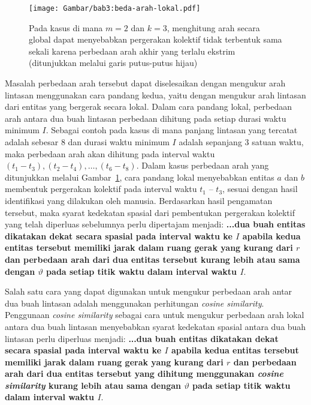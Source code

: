 \begin{figure}[h]
    \centering
    \captionsetup{width=0.8\textwidth}
    \texttt{[image: Gambar/bab3:beda-arah-lokal.pdf]}
    \caption[Masalah identifikasi pada penghitungan arah secara global]{Pada kasus di mana $m = 2$ dan $k = 3$, menghitung arah secara global dapat menyebabkan pergerakan kolektif tidak terbentuk sama sekali karena perbedaan arah akhir yang terlalu ekstrim (ditunjukkan melalui garis putus-putus hijau)}
    \label{bab3:beda-arah-lokal}
\end{figure}

Masalah perbedaan arah tersebut dapat diselesaikan dengan mengukur arah lintasan menggunakan cara pandang kedua, yaitu dengan mengukur arah lintasan dari entitas yang bergerak secara lokal. Dalam cara pandang lokal, perbedaan arah antara dua buah lintasan perbedaan dihitung pada setiap durasi waktu minimum $I$. Sebagai contoh pada kasus di mana panjang lintasan yang tercatat adalah sebesar $8$ dan durasi waktu minimum $I$ adalah sepanjang $3$ satuan waktu, maka perbedaan arah akan dihitung pada interval waktu $(t_1 - t_3), (t_2 - t_4), \ldots, (t_6 - t_8)$. Dalam kasus perbedaan arah yang ditunjukkan melalui Gambar~\ref{bab3:beda-arah-lokal}, cara pandang lokal menyebabkan entitas $a$ dan $b$ membentuk pergerakan kolektif pada interval waktu $t_1$ -- $t_3$, sesuai dengan hasil identifikasi yang dilakukan oleh manusia. Berdasarkan hasil pengamatan tersebut, maka syarat kedekatan spasial dari pembentukan pergerakan kolektif yang telah diperluas sebelumnya perlu dipertajam menjadi: \textbf{...dua buah entitas dikatakan dekat secara spasial pada interval waktu ke $I$ apabila kedua entitas tersebut memiliki jarak dalam ruang gerak yang kurang dari $r$ dan perbedaan arah dari dua entitas tersebut kurang lebih atau sama dengan $\vartheta$ pada setiap titik waktu dalam interval waktu $I$}.

Salah satu cara yang dapat digunakan untuk mengukur perbedaan arah antar dua buah lintasan adalah menggunakan perhitungan \textit{cosine similarity}. Penggunaan \textit{cosine similarity} sebagai cara untuk mengukur perbedaan arah lokal antara dua buah lintasan menyebabkan syarat kedekatan spasial antara dua buah lintasan perlu diperluas menjadi: \textbf{...dua buah entitas dikatakan dekat secara spasial pada interval waktu ke $I$ apabila kedua entitas tersebut memiliki jarak dalam ruang gerak yang kurang dari $r$ dan perbedaan arah dari dua entitas tersebut yang dihitung menggunakan \textit{cosine similarity} kurang lebih atau sama dengan $\vartheta$ pada setiap titik waktu dalam interval waktu $I$}.
    
